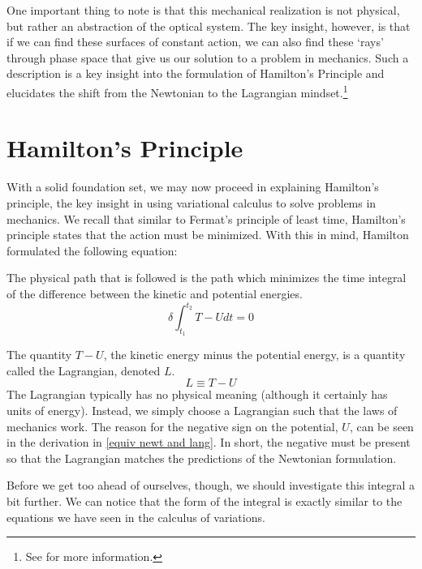 One important thing to note is that this mechanical realization is not physical, but rather an abstraction of the optical system. The key insight, however, is that if we can find these surfaces of constant action, we can also find these `rays' through phase space that give us our solution to a problem in mechanics. Such a description is a key insight into the formulation of Hamilton's Principle and elucidates the shift from the Newtonian to the \gls{Lagrangian} mindset.\footnote{ See \cite{abide_by_reason_how_2025} for more information.}

\section{Hamilton's Principle}
With a solid foundation set, we may now proceed in explaining Hamilton's principle, the key insight in using variational calculus to solve problems in mechanics. We recall that similar to Fermat's principle of least time, Hamilton's principle states that the \gls{action} must be minimized. With this in mind, Hamilton formulated the following equation:

\begin{theorem}
The physical path that is followed is the path which minimizes the time integral of the difference between the kinetic and potential energies.
$$\delta \int_{t_1}^{t_2}{T-U}{dt}=0$$
\end{theorem}

The quantity $T-U$, the kinetic energy minus the potential energy, is a quantity called the \gls{Lagrangian}, denoted $L$. 
\begin{equation}
    L\equiv T-U
\end{equation}
The \gls{Lagrangian} typically has no physical meaning (although it certainly has units of energy). Instead, we simply choose a \gls{Lagrangian} such that the laws of mechanics work. The reason for the negative sign on the potential, $U$, can be seen in the derivation in \autoref{equiv newt and lang}. In short, the negative must be present so that the \gls{Lagrangian} matches the predictions of the Newtonian formulation.

Before we get too ahead of ourselves, though, we should investigate this integral a bit further. We can notice that the form of the integral is exactly similar to the equations we have seen in the calculus of variations.

